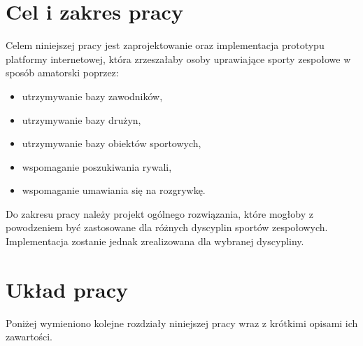 \section{Cel i zakres pracy}

Celem niniejszej pracy jest zaprojektowanie oraz implementacja prototypu platformy internetowej, która zrzeszałaby osoby uprawiające sporty zespołowe w sposób amatorski poprzez:

\begin{itemize}
  \item utrzymywanie bazy zawodników,
  \item utrzymywanie bazy drużyn,
  \item utrzymywanie bazy obiektów sportowych,
  \item wspomaganie poszukiwania rywali,
  \item wspomaganie umawiania się na rozgrywkę.
\end{itemize} 

Do zakresu pracy należy projekt ogólnego rozwiązania, które mogłoby z powodzeniem być zastosowane dla różnych dyscyplin sportów zespołowych. Implementacja zostanie jednak zrealizowana dla wybranej dyscypliny.


\begin{comment}


Jako dyscyplina została wybrana koszykówka 3 na 3, która jest młodą . Projektowany system został nazwany Team Challenge. Nazwa ta nawiązuje do głównej funkcjonalności systemu jaką jest rzucanie wyzwań. "Team" odnosi się do głównej grupy docelowej systemu czyli drużyn. "Challenge" nawiązuje do funkcjonalności rzucania wyzwań. I coś że rózne formy wyzwań są popularne. IceBucket Challenge itp. I że może budzić z tego powodu zainteresowanie.

Projektowany system został nazwany Team Challenge. 

Ze względu na duży rozwój

TODO O tym że projekt ogólny a implementacja dla wybranej dziedziny a konkretnie koszykówki 3 na 3 która budzi co raz większe zainteresowanie i np będzie na igrzyskach olimpijskich. Wybór ze względu na popularność dyscypliny i brak dla niej istniejącego rozwiązania\cite{JS07}).
\end{comment}


\section{Układ pracy}

Poniżej wymieniono kolejne rozdziały niniejszej pracy wraz z krótkimi opisami ich zawartości.

